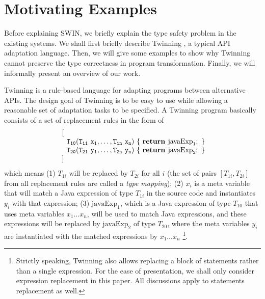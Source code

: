 \section{Motivating Examples}
\label{sec:examples}

Before explaining SWIN,
we briefly explain the type safety problem in the 
existing systems.
We shall first briefly describe Twinning \cite{twinning}, 
a typical API adaptation language.
Then, we will
give some examples to show why Twinning cannot preserve the type
correctness in program transformation. Finally, we will informally
present an overview of our work.

Twinning is a rule-based language for adapting programs between
alternative APIs. The design goal of Twinning is to be easy to use
while allowing a reasonable set of adaptation tasks to be
specified. 
A Twinning program basically consists of a set of replacement rules 
in the form of
\[
\begin{array}{ll}
~[ \\
\tt\quad T_{10} (T_{11}~x_1, \ldots, T_{1n}~x_n)~\{~ \mbox{{\bf return }javaExp}_1;~\}\\
\tt\quad T_{20} (T_{21}~y_1, \ldots, T_{2n}~y_n)~\{~ \mbox{{\bf return }javaExp}_2;~\}\\
~]
\end{array}
\]
which means (1) $T_{1i}$ will be replaced by $T_{2i}$ for all $i$ (the
set of pairs $[T_{1i}, T_{2i}]$ from all replacement rules are called
a \emph{type mapping}); (2) $x_i$ is a meta variable that will match a
Java expression of type $T_{1i}$ in the source code and instantiates
$y_i$ with that expression;
(3)
$\mbox{javaExp}_1$, which is a Java expression of type $T_{10}$ that uses meta 
variables $x_1\ldots x_n$, will be used to match Java expressions, and these
expressions will be replaced by $\mbox{javaExp}_2$ of type $T_{20}$, where the meta
variables $y_i$ are instantiated with the matched expressions by $x_1\ldots x_n$
\footnote{Strictly speaking, Twinning also allows replacing a
  block of statements rather than a single expression. For the ease of
  presentation, we shall only consider expression replacement in this
  paper. All discussions apply to statements replacement as well.}.
%
%

